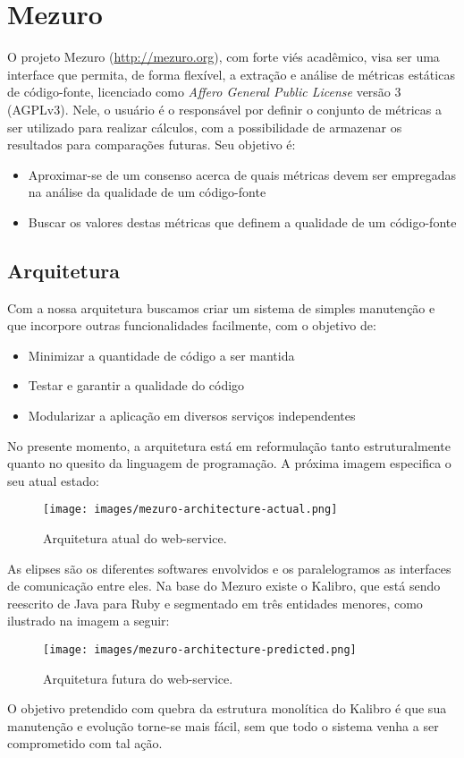 \documentclass[10pt]{article}
\begin{document}
\section{Mezuro}
O projeto Mezuro (\url{http://mezuro.org}), com forte viés acadêmico, visa ser uma interface que permita, de forma flexível, a extração e análise de métricas estáticas de código-fonte, licenciado como \textit{Affero General Public License} versão 3 (AGPLv3). Nele, o usuário é o responsável por definir o conjunto de métricas a ser utilizado para realizar cálculos, com a possibilidade de armazenar os resultados para comparações futuras. Seu objetivo é:
\begin{itemize}
    \item Aproximar-se de um consenso acerca de quais métricas devem ser empregadas na análise da qualidade de um código-fonte
    \item Buscar os valores destas métricas que definem a qualidade de um código-fonte
\end{itemize}
  \subsection{Arquitetura}
  Com a nossa arquitetura buscamos criar um sistema de simples manutenção e que incorpore outras funcionalidades facilmente, com o objetivo de:
  \begin{itemize}
    \item Minimizar a quantidade de código a ser mantida
    \item Testar e garantir a qualidade do código
    \item Modularizar a aplicação em diversos serviços independentes
  \end{itemize}
  No presente momento, a arquitetura está em reformulação tanto estruturalmente quanto no quesito da linguagem de programação.
  A próxima imagem especifica o seu atual estado:
  \begin{figure}[H]
    \centering
      \texttt{[image: images/mezuro-architecture-actual.png]}
    \caption{Arquitetura atual do web-service.}
    \label{fig:architecture-1}
  \end{figure}
  As elipses são os diferentes softwares envolvidos e os paralelogramos as interfaces de comunicação entre eles. Na base do Mezuro existe o Kalibro, que está sendo reescrito
  de Java para Ruby e segmentado em três entidades menores, como ilustrado na imagem a seguir:
  \begin{figure}[H]
    \centering
      \texttt{[image: images/mezuro-architecture-predicted.png]}
    \caption{Arquitetura futura do web-service.}
    \label{fig:architecture-1}
  \end{figure}
  O objetivo pretendido com quebra da estrutura monolítica do Kalibro é que sua manutenção e evolução torne-se mais fácil, sem que todo o sistema venha a ser comprometido com tal ação.
\end{document}
